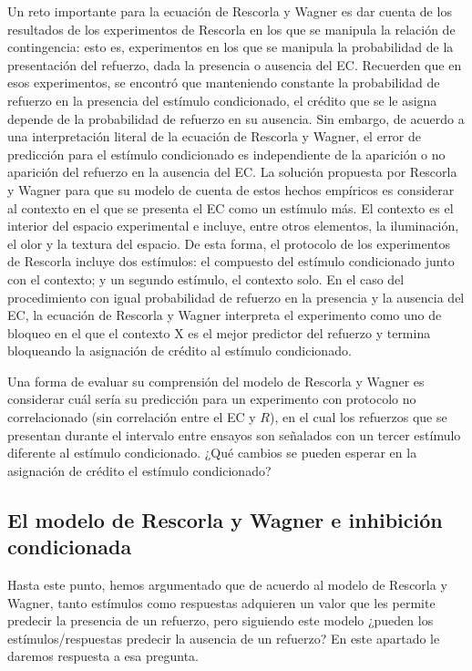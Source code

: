 \documentclass[
  letterpaper,
]{book}
\begin{document}
Un reto importante para la ecuación de Rescorla y Wagner es dar cuenta
de los resultados de los experimentos de Rescorla en los que se manipula
la relación de contingencia: esto es, experimentos en los que se
manipula la probabilidad de la presentación del refuerzo, dada la
presencia o ausencia del EC. Recuerden que en esos experimentos, se
encontró que manteniendo constante la probabilidad de refuerzo en la
presencia del estímulo condicionado, el crédito que se le asigna depende
de la probabilidad de refuerzo en su ausencia. Sin embargo, de acuerdo a
una interpretación literal de la ecuación de Rescorla y Wagner, el error
de predicción para el estímulo condicionado es independiente de la
aparición o no aparición del refuerzo en la ausencia del EC. La solución
propuesta por Rescorla y Wagner para que su modelo de cuenta de estos
hechos empíricos es considerar al contexto en el que se presenta el EC
como un estímulo más. El contexto es el interior del espacio
experimental e incluye, entre otros elementos, la iluminación, el olor y
la textura del espacio. De esta forma, el protocolo de los experimentos
de Rescorla incluye dos estímulos: el compuesto del estímulo
condicionado junto con el contexto; y un segundo estímulo, el contexto
solo. En el caso del procedimiento con igual probabilidad de refuerzo en
la presencia y la ausencia del EC, la ecuación de Rescorla y Wagner
interpreta el experimento como uno de bloqueo en el que el contexto X es
el mejor predictor del refuerzo y termina bloqueando la asignación de
crédito al estímulo condicionado.

Una forma de evaluar su comprensión del modelo de Rescorla y Wagner es
considerar cuál sería su predicción para un experimento con protocolo no
correlacionado (sin correlación entre el EC y \(R\)), en el cual los
refuerzos que se presentan durante el intervalo entre ensayos son
señalados con un tercer estímulo diferente al estímulo condicionado.
¿Qué cambios se pueden esperar en la asignación de crédito el estímulo
condicionado?

\subsection{El modelo de Rescorla y Wagner e inhibición
condicionada}\label{el-modelo-de-rescorla-y-wagner-e-inhibiciuxf3n-condicionada}

Hasta este punto, hemos argumentado que de acuerdo al modelo de Rescorla
y Wagner, tanto estímulos como respuestas adquieren un valor que les
permite predecir la presencia de un refuerzo, pero siguiendo este modelo
¿pueden los estímulos/respuestas predecir la ausencia de un refuerzo? En
este apartado le daremos respuesta a esa pregunta.
\end{document}
